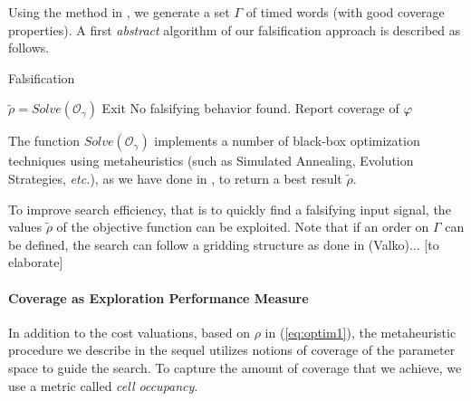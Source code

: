 Using the method in \cite{Cosmos}, we generate a set $\Gamma$ of timed words (with good coverage properties). A first {\em abstract} algorithm of our falsification approach is described as follows.
\begin{algorithm}
\caption{Falsification}
\begin{algorithmic}
	        \ForAll{$\gamma \in \Gamma$} 
		\State $\tilde{\rho} = Solve(\mathcal{O}_{\gamma})$
		  \State Exit	
		\EndIf
		\EndFor
		\State No falsifying behavior found. Report coverage of $\varphi$
\end{algorithmic}
\end{algorithm}
The function $Solve(\mathcal{O}_{\gamma})$ implements a number of black-box optimization techniques using metaheuristics (such as Simulated Annealing, Evolution Strategies, {\it etc.}), as we have done in \cite{}, to return a best result $\tilde{\rho}$. 

To improve search efficiency, that is to quickly find a falsifying input signal, the values $\tilde{\rho}$ of the objective function can be exploited. Note that if an order on $\Gamma$ can be defined, the search can follow a gridding structure as done in \cite{Valko2018} (Valko)... {\color{red} [to elaborate]}


\paragraph{Coverage as Exploration Performance Measure}	

In addition to the cost valuations, based on $\rho$ in (\ref{eq:optim1}),
the metaheuristic procedure we describe in the sequel utilizes notions of coverage of the parameter space to guide the search.
To capture the amount of coverage that we achieve, we use a metric called {\em cell occupancy}. 


